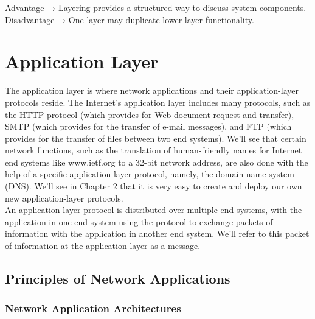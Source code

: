 \documentclass[12pt]{article}
\begin{document}
Advantage → Layering provides a structured way to discuss system components. \\
Disadvantage → One layer may duplicate lower-layer functionality. \\

\newpage

\section{Application Layer}

The application layer is where network applications and their application-layer protocols reside. The Internet's application layer includes many protocols, such as the HTTP protocol (which provides for Web document request and transfer), SMTP (which provides for the transfer of e-mail messages), and FTP (which provides for the transfer of files between two end systems). We'll see that certain network functions, such as the translation of human-friendly names for Internet end systems like www.ietf.org to a 32-bit network address, are also done with the help of a specific application-layer protocol, namely, the domain name system (DNS). We'll see in Chapter 2 that it is very easy to create and deploy our own new application-layer protocols.
\vspace{0.5cm} \\
An application-layer protocol is distributed over multiple end systems, with the application in one end system using the protocol to exchange packets of information with the application in another end system. We'll refer to this packet of information at the application layer as a message.

\subsection{Principles of Network Applications}

\subsubsection{Network Application Architectures}
\end{document}
